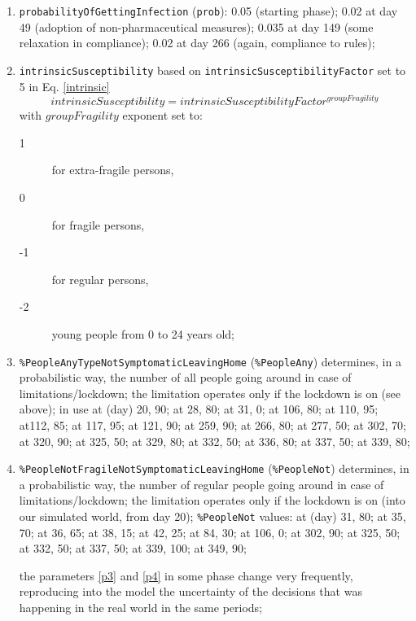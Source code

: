 \documentclass[graybox]{svmult}
\begin{document}
\begin{enumerate}[label=\roman*]

\item \label{p1} \verb|probabilityOfGettingInfection| (\verb|prob|): 0.05 (starting phase); 0.02 at day 49 (adoption of non-pharmaceutical measures); 0.035 at day 149 (some relaxation in compliance); 0.02 at day 266 (again, compliance to rules);  

\item \label{p2} \verb|intrinsicSusceptibility| based on \verb!intrinsicSusceptibilityFactor! set to 5 in Eq. \ref{intrinsic}
\begin{equation}
intrinsicSusceptibility = intrinsicSusceptibilityFactor^{groupFragility}
\label{intrinsic}
\end{equation}
with $groupFragility$ exponent set to:

\begin{description}
\item [1] for extra-fragile persons,
\item [0] for fragile persons,
\item [-1] for regular persons,
\item [-2] young people from 0 to 24 years old;
\end{description}

\item \label{p3} \verb|%PeopleAnyTypeNotSymptomaticLeavingHome| (\verb|%PeopleAny|)
determines, in a probabilistic way, the number of all people going around in case of limitations/lockdown; 
the limitation operates only if the lockdown is on (see above); in use
at (day) 20, 90; at 28, 80; at 31, 0; at 106, 80; at 110, 95; at112, 85; at 117, 95; at 121, 90; at 259, 90; at 266, 80; at 277, 50;
at 302, 70; at 320, 90; at 325, 50; at 329, 80; at 332, 50; at 336, 80; at 337, 50; at 339, 80; 

\item \label{p4} \verb|%PeopleNotFragileNotSymptomaticLeavingHome| (\verb|%PeopleNot|)
determines, in a probabilistic way, the number of regular people going around in case of limitations/lockdown;
the limitation operates only if the lockdown is on (into our simulated world, from day 20); \verb|%PeopleNot| values: 
at (day) 31, 80; at 35, 70; at 36, 65; at 38, 15; at 42, 25; at 84, 30; at 106, 0; at 302, 90; at 325, 50; at 332, 50; 
at 337, 50; at 339, 100; at 349, 90;

the parameters \ref{p3} and \ref{p4} in some phase change very frequently, reproducing into the model the uncertainty of the decisions that was happening  in the real world in the same periods; 


\end{enumerate}
\end{document}
